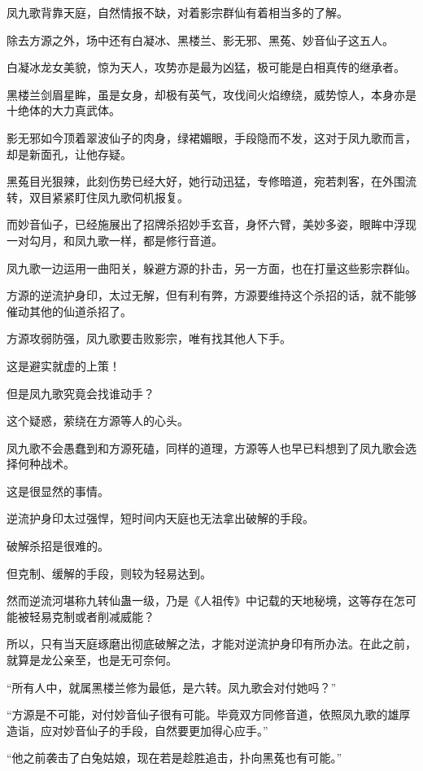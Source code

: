 
\begin{this_body}

凤九歌背靠天庭，自然情报不缺，对着影宗群仙有着相当多的了解。

除去方源之外，场中还有白凝冰、黑楼兰、影无邪、黑菟、妙音仙子这五人。

白凝冰龙女美貌，惊为天人，攻势亦是最为凶猛，极可能是白相真传的继承者。

黑楼兰剑眉星眸，虽是女身，却极有英气，攻伐间火焰缭绕，威势惊人，本身亦是十绝体的大力真武体。

影无邪如今顶着翠波仙子的肉身，绿裙媚眼，手段隐而不发，这对于凤九歌而言，却是新面孔，让他存疑。

黑菟目光狠辣，此刻伤势已经大好，她行动迅猛，专修暗道，宛若刺客，在外围流转，双目紧紧盯住凤九歌伺机报复。

而妙音仙子，已经施展出了招牌杀招妙手玄音，身怀六臂，美妙多姿，眼眸中浮现一对勾月，和凤九歌一样，都是修行音道。

凤九歌一边运用一曲阳关，躲避方源的扑击，另一方面，也在打量这些影宗群仙。

方源的逆流护身印，太过无解，但有利有弊，方源要维持这个杀招的话，就不能够催动其他的仙道杀招了。

方源攻弱防强，凤九歌要击败影宗，唯有找其他人下手。

这是避实就虚的上策！

但是凤九歌究竟会找谁动手？

这个疑惑，萦绕在方源等人的心头。

凤九歌不会愚蠢到和方源死磕，同样的道理，方源等人也早已料想到了凤九歌会选择何种战术。

这是很显然的事情。

逆流护身印太过强悍，短时间内天庭也无法拿出破解的手段。

破解杀招是很难的。

但克制、缓解的手段，则较为轻易达到。

然而逆流河堪称九转仙蛊一级，乃是《人祖传》中记载的天地秘境，这等存在怎可能被轻易克制或者削减威能？

所以，只有当天庭琢磨出彻底破解之法，才能对逆流护身印有所办法。在此之前，就算是龙公亲至，也是无可奈何。

“所有人中，就属黑楼兰修为最低，是六转。凤九歌会对付她吗？”

“方源是不可能，对付妙音仙子很有可能。毕竟双方同修音道，依照凤九歌的雄厚造诣，应对妙音仙子的手段，自然要更加得心应手。”

“他之前袭击了白兔姑娘，现在若是趁胜追击，扑向黑菟也有可能。”


\end{this_body}
